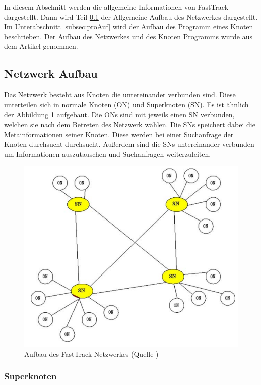 In diesem Abschnitt werden die allgemeine Informationen von FastTrack dargestellt.
Dann wird Teil \ref{subsec:netAuf} der Allgemeine Aufbau des Netzwerkes dargestellt. 
Im Unterabschnitt \ref{subsec:proAuf} wird der Aufbau des Programm eines Knoten beschrieben.
Der Aufbau des Netzwerkes und des Knoten Programms wurde aus dem Artikel \cite{liang2006fasttrack} genommen.

\subsection{Netzwerk Aufbau}
\label{subsec:netAuf}

Das Netzwerk besteht aus Knoten die untereinander verbunden sind.
Diese unterteilen sich in normale Knoten (ON) und Superknoten (SN).
Es ist ähnlich der Abbildung \ref{fig:auf} aufgebaut.
Die ONs sind mit jeweils einen SN verbunden, welchen sie nach dem Betreten des Netzwerk wählen.
Die SNs speichert dabei die Metainformationen seiner Knoten.
Diese werden bei einer Suchanfrage der Knoten durchsucht durchsucht.
Außerdem sind die SNs untereinander verbunden um Informationen auszutauschen und Suchanfragen weiterzuleiten.

\begin{figure}
\includegraphics[scale=0.3]{gfx/aufbau}
\caption{Aufbau des FastTrack Netzwerkes (Quelle \cite{liang2006fasttrack})}
\label{fig:auf}
\end{figure}

\subsubsection{Superknoten}


